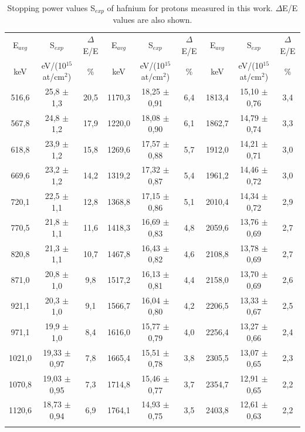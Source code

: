 \documentclass[aps,pra,reprint,groupedaddress]{revtex4-1}
\begin{document}
\begin{table}[!t]
\centering
\caption{Stopping power values S$_{exp}$ of hafnium for protons measured in this work. $\Delta$E/E values are also shown.
\label{table01}}

\vspace{0.2cm}

\begin{ruledtabular}
\begin{tabular}{ccc|ccc|ccc} %
E$_{avg}$	&S$_{exp}$			&$\Delta$E/E	&E$_{avg}$	&S$_{exp}$			&$\Delta$E/E	&E$_{avg}$	&S$_{exp}$			&$\Delta$E/E\\
keV		&eV/(10$^{15}$ at/cm$^2$)	&$\%$		&keV		&eV/(10$^{15}$ at/cm$^2$)	&$\%$		&keV		&eV/(10$^{15}$ at/cm$^2$)	&$\%$\\ \hline
516,6	&	25,8	$\pm$	1,3	&	20,5	&	1170,3	&	18,25	$\pm$	0,91	&	6,4	&	1813,4	&	15,10	$\pm$	0,76	&	3,4	\\
567,8	&	24,8	$\pm$	1,2	&	17,9	&	1220,0	&	18,08	$\pm$	0,90	&	6,1	&	1862,7	&	14,79	$\pm$	0,74	&	3,3	\\
618,8	&	23,9	$\pm$	1,2	&	15,8	&	1269,6	&	17,57	$\pm$	0,88	&	5,7	&	1912,0	&	14,21	$\pm$	0,71	&	3,0	\\
669,6	&	23,2	$\pm$	1,2	&	14,2	&	1319,2	&	17,32	$\pm$	0,87	&	5,4	&	1961,2	&	14,46	$\pm$	0,72	&	3,0	\\
720,1	&	22,5	$\pm$	1,1	&	12,8	&	1368,8	&	17,15	$\pm$	0,86	&	5,1	&	2010,4	&	14,34	$\pm$	0,72	&	2,9	\\
770,5	&	21,8	$\pm$	1,1	&	11,6	&	1418,3	&	16,69	$\pm$	0,83	&	4,8	&	2059,6	&	13,76	$\pm$	0,69	&	2,7	\\
820,8	&	21,3	$\pm$	1,1	&	10,7	&	1467,8	&	16,43	$\pm$	0,82	&	4,6	&	2108,8	&	13,78	$\pm$	0,69	&	2,7	\\
871,0	&	20,8	$\pm$	1,0	&	9,8	&	1517,2	&	16,13	$\pm$	0,81	&	4,4	&	2158,0	&	13,70	$\pm$	0,69	&	2,6	\\
921,1	&	20,3	$\pm$	1,0	&	9,1	&	1566,7	&	16,04	$\pm$	0,80	&	4,2	&	2206,5	&	13,33	$\pm$	0,67	&	2,5	\\
971,1	&	19,9	$\pm$	1,0	&	8,4	&	1616,0	&	15,77	$\pm$	0,79	&	4,0	&	2256,4	&	13,27	$\pm$	0,66	&	2,4	\\
1021,0	&	19,33	$\pm$	0,97	&	7,8	&	1665,4	&	15,51	$\pm$	0,78	&	3,8	&	2305,5	&	13,07	$\pm$	0,65	&	2,3	\\
1070,8	&	19,03	$\pm$	0,95	&	7,3	&	1714,8	&	15,46	$\pm$	0,77	&	3,7	&	2354,7	&	12,91	$\pm$	0,65	&	2,2	\\
1120,6	&	18,73	$\pm$	0,94	&	6,9	&	1764,1	&	14,93	$\pm$	0,75	&	3,5	&	2403,8	&	12,61	$\pm$	0,63	&	2,2	\\ \\ %
\end{tabular}
\end{ruledtabular}
\end{table}
\end{document}
